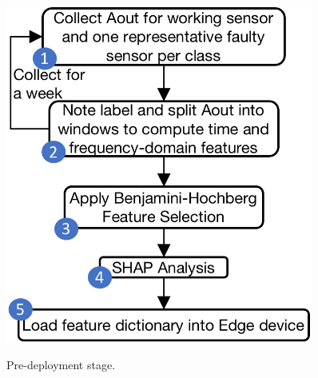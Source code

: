 \documentclass[manuscript,screen,review]{acmart} %
\providecommand{\DIFdel}[1]{{\protect\color{red}\sout{#1}}}                      %
\providecommand{\DIFdelFL}[1]{\DIFdel{#1}} %
\providecommand{\DIFaddbeginFL}{} %
\providecommand{\DIFaddendFL}{} %
\providecommand{\DIFdelbeginFL}{} %
\providecommand{\DIFdelendFL}{} %
\newcommand{\DIFscaledelfig}{0.5}
\newlength{\DIFdelgraphicswidth} %
\newlength{\DIFdelgraphicsheight} %
\newcommand{\DIFaddincludegraphics}[2][]{{\color{blue}\fbox{\DIFOincludegraphics[#1]{#2}}}} %
\newcommand{\DIFdelincludegraphics}[2][]{%
\sbox{\DIFdelgraphicsbox}{\DIFOincludegraphics[#1]{#2}}%
\settoboxwidth{\DIFdelgraphicswidth}{\DIFdelgraphicsbox} %
\settoboxtotalheight{\DIFdelgraphicsheight}{\DIFdelgraphicsbox} %
\scalebox{\DIFscaledelfig}{%
\parbox[b]{\DIFdelgraphicswidth}{\usebox{\DIFdelgraphicsbox}\\[-\baselineskip] \rule{\DIFdelgraphicswidth}{0em}}\llap{\resizebox{\DIFdelgraphicswidth}{\DIFdelgraphicsheight}{%
\setlength{\unitlength}{\DIFdelgraphicswidth}%
\begin{picture}(1,1)%
\thicklines\linethickness{2pt} %
{\color[rgb]{1,0,0}\put(0,0){\framebox(1,1){}}}%
{\color[rgb]{1,0,0}\put(0,0){\line( 1,1){1}}}%
{\color[rgb]{1,0,0}\put(0,1){\line(1,-1){1}}}%
\end{picture}%
}\hspace*{3pt}}} %
} %
\DeclareRobustCommand{\DIFaddbeginFL}{\DIFOaddbeginFL \let\includegraphics\DIFaddincludegraphics} %
\DeclareRobustCommand{\DIFaddendFL}{\DIFOaddendFL \let\includegraphics\DIFOincludegraphics} %
\DeclareRobustCommand{\DIFdelbeginFL}{\DIFOdelbeginFL \let\includegraphics\DIFdelincludegraphics} %
\DeclareRobustCommand{\DIFdelendFL}{\DIFOaddendFL \let\includegraphics\DIFOincludegraphics} %
\begin{document}
\begin{figure}
	\DIFdelbeginFL %
\DIFdelendFL \begin{minipage}[t]{0.26\textwidth}
		\centering
		\DIFdelbeginFL %
\DIFdelendFL \DIFaddbeginFL \includegraphics[width=0.9\textwidth]{figures/deployment/predeployment-stage-2.png}
\DIFaddendFL \caption{\DIFdelbeginFL %
\DIFdelendFL \DIFaddbeginFL \footnotesize{Pre-deployment stage}\DIFaddendFL .}
\label{fig:pre_deployment_steps}
	\end{minipage}\DIFdelbeginFL \DIFdelFL{\hspace{1ex}
	}%
\DIFdelendFL \DIFaddbeginFL \hfill
    \begin{minipage}[t]{0.22\textwidth}
		\DIFaddendFL \centering

\end{minipage}
\end{figure}
\end{document}
